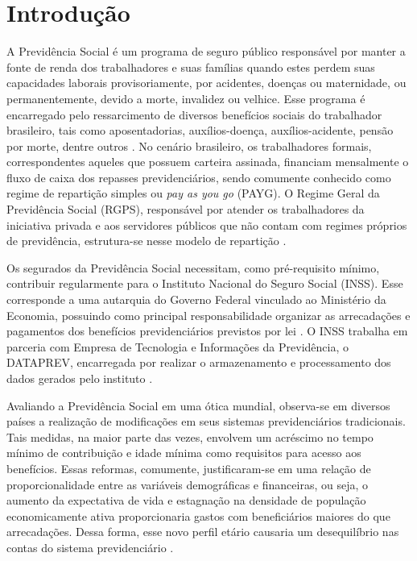 
\chapter{Introdução}

A Previdência Social é um programa de seguro público responsável por manter a fonte de renda dos trabalhadores e suas famílias quando estes perdem suas capacidades laborais provisoriamente, por acidentes, doenças ou maternidade, ou permanentemente, devido a morte, invalidez ou velhice. Esse programa é encarregado pelo ressarcimento de diversos benefícios sociais do trabalhador brasileiro, tais como aposentadorias, auxílios-doença, auxílios-acidente, pensão por morte, dentre outros \cite{cap04_ref6}. No cenário brasileiro, os trabalhadores formais, correspondentes aqueles que possuem carteira assinada, financiam mensalmente o fluxo de caixa dos repasses previdenciários, sendo comumente conhecido como regime de repartição simples ou \textit{pay as you go} (PAYG). O Regime Geral da Previdência Social (RGPS), responsável por atender os trabalhadores da iniciativa privada e aos servidores públicos que não contam com regimes próprios de previdência, estrutura-se nesse modelo de repartição \cite{cap05_ref11}.

Os segurados da Previdência Social necessitam, como pré-requisito mínimo, contribuir regularmente para o Instituto Nacional do Seguro Social (INSS). Esse corresponde a uma autarquia do Governo Federal vinculado ao Ministério da Economia, possuindo como principal responsabilidade organizar as arrecadações e pagamentos dos benefícios previdenciários previstos por lei \cite{cap01_ref1}. O INSS trabalha em parceria com Empresa de Tecnologia e Informações da Previdência, o DATAPREV, encarregada por realizar o armazenamento e processamento dos dados gerados pelo instituto \cite{cap01_ref2}.

Avaliando a Previdência Social em uma ótica mundial, observa-se em diversos países a realização de modificações em seus sistemas previdenciários tradicionais. Tais medidas, na maior parte das vezes, envolvem um acréscimo no tempo mínimo de contribuição e idade mínima como requisitos para acesso aos benefícios. Essas reformas, comumente, justificaram-se em uma relação de proporcionalidade entre as variáveis demográficas e financeiras, ou seja, o aumento da expectativa de vida e estagnação na densidade de população economicamente ativa proporcionaria gastos com beneficiários maiores do que arrecadações. Dessa forma, esse novo perfil etário causaria um desequilíbrio nas contas do sistema previdenciário \cite{cap01_ref3, cap03_ref5}. 

